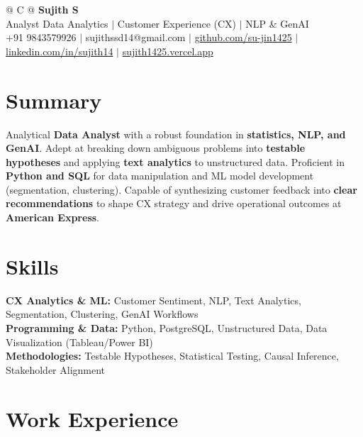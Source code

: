 \documentclass[a4paper,10pt]{article}
\newcommand{\ulink}[2]{\href{#1}{#2}}
\begin{document}
\pagestyle{empty}

\begin{tabularx}{\linewidth}{@{} C @{}}
{\color[HTML]{000000}\fontsize{30}{35}\selectfont\bfseries Sujith S} \\[5pt]
{\fontsize{10.5}{12.5}\selectfont\color[HTML]{3A3A3A}
Analyst Data Analytics $|$ Customer Experience (CX) $|$ NLP \& GenAI} \\[6pt]
{\fontsize{9.5}{11.5}\selectfont\textcolor[HTML]{3A3A3A}{+91 9843579926 $|$ sujithssd14@gmail.com $|$ \ulink{https://github.com/su-jin1425}{github.com/su-jin1425} $|$ \ulink{https://linkedin.com/in/sujith14}{linkedin.com/in/sujith14} $|$ \ulink{https://sujith1425.vercel.app}{sujith1425.vercel.app}}}
\end{tabularx}

\section{Summary}
\vspace{2pt}

{\color[HTML]{0A0A0A}\fontsize{11}{14}\selectfont
Analytical \textbf{Data Analyst} with a robust foundation in \textbf{statistics, NLP, and GenAI}. Adept at breaking down ambiguous problems into \textbf{testable hypotheses} and applying \textbf{text analytics} to unstructured data. Proficient in \textbf{Python and SQL} for data manipulation and ML model development (segmentation, clustering). Capable of synthesizing customer feedback into \textbf{clear recommendations} to shape CX strategy and drive operational outcomes at \textbf{American Express}.}

\section{Skills}
\vspace{2pt}

{\color[HTML]{0A0A0A}\fontsize{11}{14}\selectfont
\textbf{CX Analytics \& ML:} Customer Sentiment, NLP, Text Analytics, Segmentation, Clustering, GenAI Workflows \\[2pt]
\textbf{Programming \& Data:} Python, PostgreSQL, Unstructured Data, Data Visualization (Tableau/Power BI) \\[2pt]
\textbf{Methodologies:} Testable Hypotheses, Statistical Testing, Causal Inference, Stakeholder Alignment}

\section{Work Experience}
\vspace{2pt}
\end{document}
